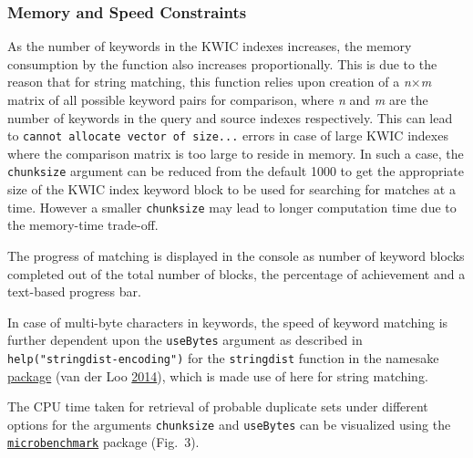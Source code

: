 \documentclass[
]{article}
\begin{document}
\hypertarget{memory-and-speed-constraints}{%
\subsubsection{Memory and Speed
Constraints}\label{memory-and-speed-constraints}}

As the number of keywords in the KWIC indexes increases, the memory
consumption by the function also increases proportionally. This is due
to the reason that for string matching, this function relies upon
creation of a \emph{n}\(\times\)\emph{m} matrix of all possible keyword
pairs for comparison, where \emph{n} and \emph{m} are the number of
keywords in the query and source indexes respectively. This can lead to
\texttt{cannot\ allocate\ vector\ of\ size...} errors in case of large
KWIC indexes where the comparison matrix is too large to reside in
memory. In such a case, the \texttt{chunksize} argument can be reduced
from the default 1000 to get the appropriate size of the KWIC index
keyword block to be used for searching for matches at a time. However a
smaller \texttt{chunksize} may lead to longer computation time due to
the memory-time trade-off.

The progress of matching is displayed in the console as number of
keyword blocks completed out of the total number of blocks, the
percentage of achievement and a text-based progress bar.

In case of multi-byte characters in keywords, the speed of keyword
matching is further dependent upon the \texttt{useBytes} argument as
described in \texttt{help("stringdist-encoding")} for the
\texttt{stringdist} function in the namesake
\href{https://CRAN.R-project.org/package=stringdist}{package} (van der
Loo \protect\hyperlink{ref-van2014stringdist}{2014}), which is made use
of here for string matching.

The CPU time taken for retrieval of probable duplicate sets under
different options for the arguments \texttt{chunksize} and
\texttt{useBytes} can be visualized using the
\href{https://CRAN.R-project.org/package=microbenchmark}{\texttt{microbenchmark}}
package (Fig.~3).
\end{document}
